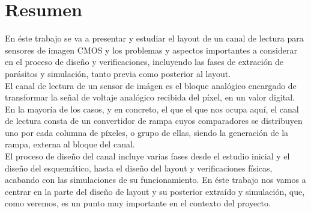 \chapter*{Resumen}
\label{cap:resumen}

En éste trabajo se va a presentar y estudiar el layout de un canal de lectura
para sensores de imagen CMOS y los problemas y aspectos importantes a considerar
en el proceso de diseño y verificaciones, incluyendo las fases de extración de
parásitos y simulación, tanto previa como posterior al layout.\\

El canal de lectura de un sensor de imágen es el bloque analógico encargado de
transformar la señal de voltaje analógico recibida del píxel, en un valor digital.
En la mayoría de los casos, y en concreto, el que el que nos ocupa aquí, el canal de lectura
consta de un convertidor de rampa cuyos comparadores se distribuyen uno por cada
columna de píxeles, o grupo de ellas, siendo la generación de la rampa, externa
al bloque del canal.\\

El proceso de diseño del canal incluye varias fases desde el estudio inicial y el diseño
del esquemático, hasta el diseño del layout y verificaciones físicas, acabando con
las simulaciones de su funcionamiento. En éste trabajo nos vamos a centrar en la
parte del diseño de layout y su posterior extraído y simulación, que, como veremos,
es un punto muy importante en el contexto del proyecto.\\
